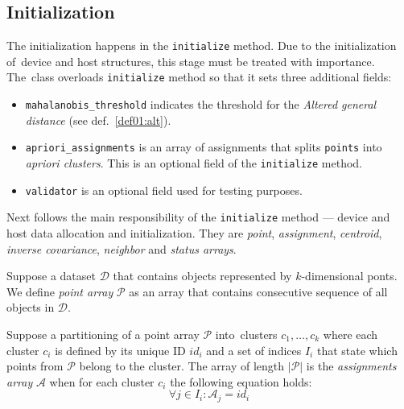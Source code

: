 \subsection{Initialization}

The initialization happens in the \texttt{initialize} method. Due to the initialization of~device and host structures, this stage must be treated with importance.
The~class overloads \texttt{initialize} method so that it sets three additional fields:
\begin{itemize}
	\item \texttt{mahalanobis\_threshold} indicates the threshold for the \emph{Altered general distance} (see def.~\ref{def01:alt}).
	
	\item\texttt{apriori\_assignments}  is an array of assignments that splits \texttt{points} into \emph{apriori clusters}. This is an optional field of the \texttt{initialize} method.
	
	\item \texttt{validator} is an optional field used for testing purposes.
\end{itemize}

Next follows the main responsibility of the \texttt{initialize} method --- device and host data allocation and initialization. They are \emph{point}, \emph{assignment}, \emph{centroid}, \emph{inverse covariance}, \emph{neighbor} and \emph{status arrays}. 

\begin{defn}
	Suppose a dataset $\mathcal{D}$ that contains objects represented by $k$-di\-men\-si\-onal ponts. We define \emph{point array} $\mathcal{P}$ as an array that contains consecutive sequence of all objects in $\mathcal{D}$.
	\label{def03:point}
\end{defn}

\begin{defn}
	Suppose a partitioning of a point array $\mathcal{P}$ into~clusters $c_1,\dots,c_k$ where each cluster $c_i$ is defined by its unique ID $id_i$ and a set of indices $I_i$ that state which points from $\mathcal{P}$ belong to the cluster. The array of length $|\mathcal{P}|$ is the \emph{assignments array} $\mathcal{A}$ when for each cluster $c_i$ the following equation holds:
	$${\forall j \in I_i : \mathcal{A}_j = id_i}$$
	\label{def03:assign}
\end{defn}

